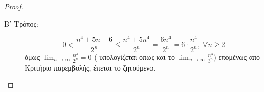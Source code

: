 \begin{enumerate}
\begin{enumerate}[i)]
\begin{proof}
\begin{description}
                        \item [Β᾽ Τρόπος:]
                            \[
                                0 < \frac{n^{4}+5n-6}{2^{n}} \leq 
                                \frac{n^{4}+5n^{4}}{2^{n}} = \frac{6n^{4}}{2^{n}} = 
                                6 \cdot \frac{n^{4}}{2^{n}}, \; \forall n \geq 2 
                             \] 
                             όμως $ \lim_{n \to \infty} \frac{n^{4}}{2^{n}} = 0 $ (
                             υπολογίζεται όπως και το $ \lim_{n \to \infty} 
                             \frac{n^{3}}{3^{n}} $)
                             επομένως από Κριτήριο παρεμβολής, έπεται το ζητούμενο.
                    \end{description}
                \end{proof}
        \end{enumerate}
    \end{enumerate}




